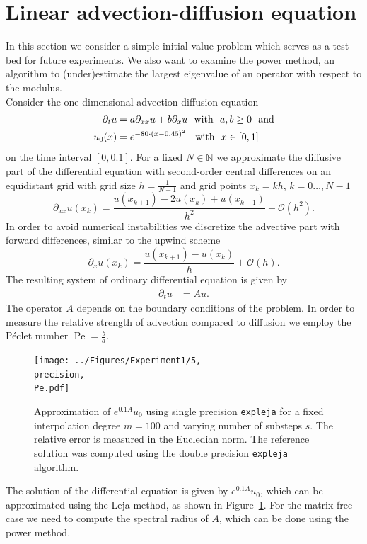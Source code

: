 \documentclass{scrartcl}
\begin{document}
\section{Linear advection-diffusion equation}\label{sec:LinearADe}
	In this section we consider a simple initial value problem which serves as a test-bed for future experiments. We also want to examine the power method, an algorithm to (under)estimate the largest eigenvalue of an operator with respect to the modulus.\\
	Consider the one-dimensional advection-diffusion equation
	\begin{align}
	\begin{split}
		\partial_tu &= a\partial_{xx}u + b\partial_xu ~~\text{with}~~ a,b\ge 0 ~~\text{and}\\
		u_0(x) &= e^{-80\cdot(x-0.45)^2}\hphantom{,} ~~\text{with}~~ x\in[0,1]
	\end{split}\label{eq:LinearAdvDif}
	\end{align}
	on the time interval $[0,0.1]$. For a fixed $N\in\mathbb N$ we approximate the diffusive part of the differential equation with second-order central differences on an equidistant grid with grid size $h = \frac{1}{N-1}$ and grid points $x_k = kh$, $k=0\dots,N-1$
	\[\partial_{xx}u(x_k) = \frac{u(x_{k+1}) - 2u(x_k) + u(x_{k-1})}{{h}^2} + \mathcal{O}({h}^2).\]
	In order to avoid numerical instabilities we discretize the advective part with forward differences, similar to the upwind scheme
	\[\partial_{x}u(x_k) = \frac{u(x_{k+1}) - u(x_k)}{h} + \mathcal{O}(h).\]
	The resulting system of ordinary differential equation is given by
	\begin{align*}
		\partial_tu &= Au.
	\end{align*}
	The operator $A$ depends on the boundary conditions of the problem. In order to measure the relative strength of advection compared to diffusion we employ the P\'eclet number $\operatorname{Pe} = \frac{b}{a}$.
	\begin{figure}[ht]
		\newcommand{\precision}{single}
		\newcommand{\Pe}{Pe=10.0}
		\centering
		\texttt{[image: ../Figures/Experiment1/5, \\precision, \\Pe.pdf]}
		\caption{Approximation of $e^{0.1A}u_0$ using single precision \texttt{expleja} for a fixed interpolation degree $m=100$ and varying number of substeps $s$. The relative error is measured in the Eucledian norm. The reference solution was computed using the double precision \texttt{expleja} algorithm.}
		\label{fig:Experiment1}
	\end{figure} 
	\noindent The solution of the differential equation is given by $e^{0.1A}u_0$, which can be approximated using the Leja method, as shown in Figure~\ref{fig:Experiment1}. For the matrix-free case we need to compute the spectral radius of $A$, which can be done using the power method.
	
\end{document}
